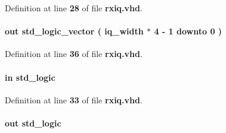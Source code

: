 Definition at line {\bf 28} of file {\bf rxiq.\+vhd}.

\paragraph[{fifo\+\_\+wdata}]{ {\bfseries \textcolor{keywordflow}{out}\textcolor{vhdlchar}{ }} {\bfseries \textcolor{comment}{std\+\_\+logic\+\_\+vector}\textcolor{vhdlchar}{ }\textcolor{vhdlchar}{(}\textcolor{vhdlchar}{ }\textcolor{vhdlchar}{ }\textcolor{vhdlchar}{ }\textcolor{vhdlchar}{ }{\bfseries {\bf iq\+\_\+width}} \textcolor{vhdlchar}{$\ast$}\textcolor{vhdlchar}{ } \textcolor{vhdldigit}{4} \textcolor{vhdlchar}{-\/}\textcolor{vhdlchar}{ } \textcolor{vhdldigit}{1} \textcolor{vhdlchar}{ }\textcolor{keywordflow}{downto}\textcolor{vhdlchar}{ }\textcolor{vhdlchar}{ } \textcolor{vhdldigit}{0} \textcolor{vhdlchar}{ }\textcolor{vhdlchar}{)}\textcolor{vhdlchar}{ }} \hspace{0.3cm}{\ttfamily [Port]}}\label{classrxiq_a880b1371c4c1600fe490c979402d668f}


Definition at line {\bf 36} of file {\bf rxiq.\+vhd}.

\paragraph[{fifo\+\_\+wfull}]{ {\bfseries \textcolor{keywordflow}{in}\textcolor{vhdlchar}{ }} {\bfseries \textcolor{comment}{std\+\_\+logic}\textcolor{vhdlchar}{ }} \hspace{0.3cm}{\ttfamily [Port]}}\label{classrxiq_a63de1b8160d1ffec718f19920aa9a2a1}


Definition at line {\bf 33} of file {\bf rxiq.\+vhd}.

\paragraph[{fifo\+\_\+wrreq}]{ {\bfseries \textcolor{keywordflow}{out}\textcolor{vhdlchar}{ }} {\bfseries \textcolor{comment}{std\+\_\+logic}\textcolor{vhdlchar}{ }} \hspace{0.3cm}{\ttfamily [Port]}}\label{classrxiq_a4643410c72f0390bde3d442228a1dfd2}


